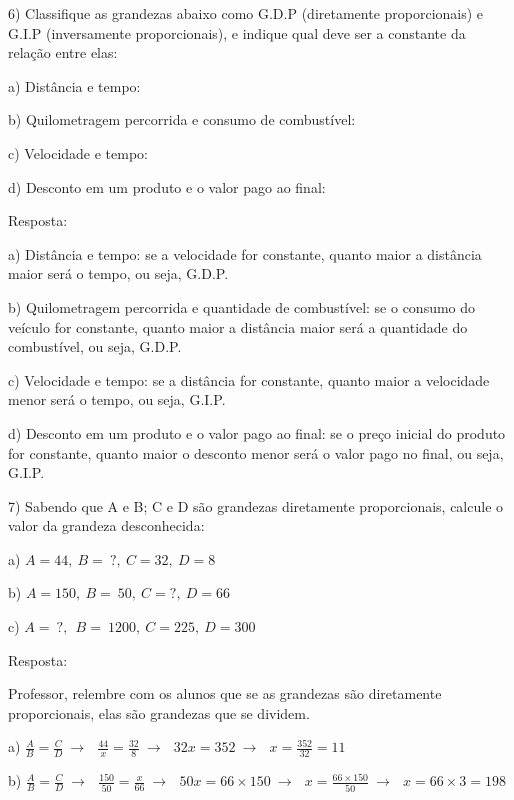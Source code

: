 
6) Classifique as grandezas abaixo como G.D.P (diretamente
proporcionais) e G.I.P (inversamente proporcionais), e indique qual deve
ser a constante da relação entre elas:

a) Distância e tempo:

b) Quilometragem percorrida e consumo de combustível:

c) Velocidade e tempo:

d) Desconto em um produto e o valor pago ao final:

Resposta:

a) Distância e tempo: se a velocidade for constante, quanto maior a
distância maior será o tempo, ou seja, G.D.P.

b) Quilometragem percorrida e quantidade de combustível: se o consumo do
veículo for constante, quanto maior a distância maior será a quantidade
do combustível, ou seja, G.D.P.

c) Velocidade e tempo: se a distância for constante, quanto maior a
velocidade menor será o tempo, ou seja, G.I.P.

d) Desconto em um produto e o valor pago ao final: se o preço inicial do
produto for constante, quanto maior o desconto menor será o valor pago
no final, ou seja, G.I.P.

7) Sabendo que A e B; C e D são grandezas diretamente proporcionais,
calcule o valor da grandeza desconhecida:

a) \(A = 44,\ B = \ ?,\ C = 32,\ D = 8\)

b) \(A = 150,\ B = \ 50,\ C = ?,\ D = 66\)

c) \(A = \ ?,\ \ B = \ 1200,\ C = 225,\ D = 300\)

Resposta:

Professor, relembre com os alunos que se as grandezas são diretamente
proporcionais, elas são grandezas que se dividem.

a)
\(\frac{A}{B} = \frac{C}{D}\  \rightarrow \ \ \ \frac{44}{x} = \frac{32}{8}\  \rightarrow \ \ \ 32x = 352\  \rightarrow \ \ \ x = \frac{352}{32} = 11\)

b)
\(\frac{A}{B} = \frac{C}{D}\  \rightarrow \ \ \ \frac{150}{50} = \frac{x}{66}\  \rightarrow \ \ \ 50x = 66 \times 150\  \rightarrow \ \ \ x = \frac{66 \times 150}{50}\  \rightarrow \ \ \ x = 66 \times 3 = 198\)

